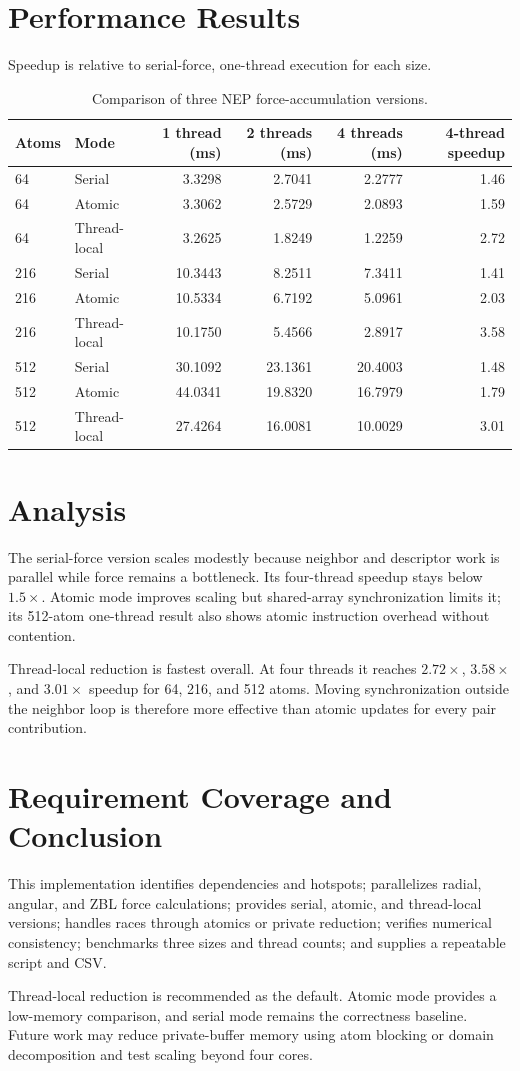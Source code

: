 \documentclass[11pt]{article}
\begin{document}
\section{Performance Results}
Speedup is relative to serial-force, one-thread execution for each size.

\begin{table}[ht]
\centering
\small
\begin{tabular}{@{}llrrrr@{}}
\toprule
Atoms & Mode & 1 thread (ms) & 2 threads (ms) & 4 threads (ms) & 4-thread speedup \\
\midrule
64  & Serial       & 3.3298  & 2.7041  & 2.2777  & 1.46 \\
64  & Atomic       & 3.3062  & 2.5729  & 2.0893  & 1.59 \\
64  & Thread-local & 3.2625  & 1.8249  & 1.2259  & 2.72 \\
\midrule
216 & Serial       & 10.3443 & 8.2511  & 7.3411  & 1.41 \\
216 & Atomic       & 10.5334 & 6.7192  & 5.0961  & 2.03 \\
216 & Thread-local & 10.1750 & 5.4566  & 2.8917  & 3.58 \\
\midrule
512 & Serial       & 30.1092 & 23.1361 & 20.4003 & 1.48 \\
512 & Atomic       & 44.0341 & 19.8320 & 16.7979 & 1.79 \\
512 & Thread-local & 27.4264 & 16.0081 & 10.0029 & 3.01 \\
\bottomrule
\end{tabular}
\caption{Comparison of three NEP force-accumulation versions.}
\end{table}

\section{Analysis}
The serial-force version scales modestly because neighbor and descriptor work
is parallel while force remains a bottleneck. Its four-thread speedup stays
below $1.5\times$. Atomic mode improves scaling but shared-array
synchronization limits it; its 512-atom one-thread result also shows atomic
instruction overhead without contention.

Thread-local reduction is fastest overall. At four threads it reaches
$2.72\times$, $3.58\times$, and $3.01\times$ speedup for 64, 216, and 512
atoms. Moving synchronization outside the neighbor loop is therefore more
effective than atomic updates for every pair contribution.

\section{Requirement Coverage and Conclusion}
This implementation identifies dependencies and hotspots; parallelizes radial,
angular, and ZBL force calculations; provides serial, atomic, and thread-local
versions; handles races through atomics or private reduction; verifies numerical
consistency; benchmarks three sizes and thread counts; and supplies a repeatable
script and CSV.

Thread-local reduction is recommended as the default. Atomic mode provides a
low-memory comparison, and serial mode remains the correctness baseline. Future
work may reduce private-buffer memory using atom blocking or domain
decomposition and test scaling beyond four cores.
\end{document}
